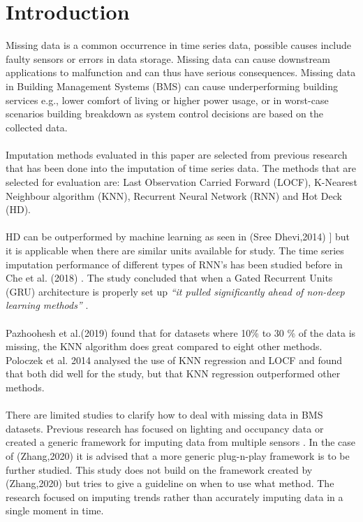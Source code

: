 \documentclass[9.5pt,article,twocolumn]{article}
\begin{document}
\section{Introduction}
Missing data is a common occurrence in time series data, possible causes include faulty sensors or errors in data storage. Missing data can cause downstream applications to malfunction and can thus have serious consequences. Missing data in Building Management Systems (BMS) can cause underperforming building services e.g., lower comfort of living or higher power usage, or in worst-case scenarios building breakdown as system control decisions are based on the collected data.
\\
\\
Imputation methods evaluated in this paper are selected from previous research that has been done into the imputation of time series data. The methods that are selected for evaluation are: Last Observation Carried Forward (LOCF), K-Nearest Neighbour algorithm (KNN), Recurrent Neural Network (RNN) and Hot Deck (HD). 
\\
\\
HD can be outperformed by machine learning as seen in (Sree Dhevi,2014)\cite{Dhevi} ] but it is applicable when there are similar units available for study. The time series imputation performance of different types of RNN’s has been studied before in Che et al. (2018) \cite{Che}. The study concluded that when a Gated Recurrent Units (GRU) architecture is properly set up \emph{“it pulled significantly ahead of non-deep learning methods”} \cite{Che}.
\\
\\
Pazhoohesh et al.(2019) \cite{Pazhoohesh}found that for datasets where 10\% to 30 \% of the data is missing, the KNN algorithm does great compared to eight other methods. Poloczek et al. 2014  \cite{Poloczek} analysed the use of KNN regression and LOCF and found that both did well for the study, but that KNN regression outperformed other methods.
\\
\\
There are limited studies to clarify how to deal with missing data in BMS datasets. Previous research has focused on lighting and occupancy \cite{Pazhoohesh} data or created a generic framework for imputing data from multiple sensors \cite{Zhang}. In the case of (Zhang,2020) it is advised that a more generic plug-n-play framework is to be further studied. This study  does not build on the framework created by (Zhang,2020) but tries to give a guideline on when to use what method. The research focused on imputing trends rather than accurately imputing data in a single moment in time.  
\end{document}
